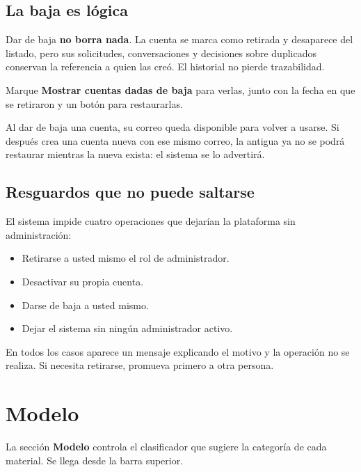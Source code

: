 \subsection{La baja es lógica}

Dar de baja \textbf{no borra nada}. La cuenta se marca como retirada y
desaparece del listado, pero sus solicitudes, conversaciones y decisiones sobre
duplicados conservan la referencia a quien las creó. El historial no pierde
trazabilidad.

Marque \textbf{Mostrar cuentas dadas de baja} para verlas, junto con la fecha en
que se retiraron y un botón para restaurarlas.


\begin{nota}
Al dar de baja una cuenta, su correo queda disponible para volver a usarse. Si
después crea una cuenta nueva con ese mismo correo, la antigua ya no se podrá
restaurar mientras la nueva exista: el sistema se lo advertirá.
\end{nota}

\subsection{Resguardos que no puede saltarse}

El sistema impide cuatro operaciones que dejarían la plataforma sin
administración:

\begin{itemize}[leftmargin=*, itemsep=3pt]
  \item Retirarse a usted mismo el rol de administrador.
  \item Desactivar su propia cuenta.
  \item Darse de baja a usted mismo.
  \item Dejar el sistema sin ningún administrador activo.
\end{itemize}

En todos los casos aparece un mensaje explicando el motivo y la operación no se
realiza. Si necesita retirarse, promueva primero a otra persona.

\newpage
\section{Modelo}

La sección \textbf{Modelo} controla el clasificador que sugiere la categoría de
cada material. Se llega desde la barra superior.

